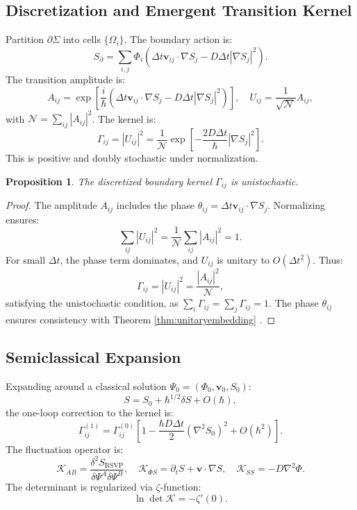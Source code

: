 \documentclass[12pt]{article}
\newtheorem{proposition}{Proposition}
\begin{document}
\subsection{Discretization and Emergent Transition Kernel}

Partition \(\partial \Sigma\) into cells \(\{\Omega_i\}\). The boundary action is:
\[
S_{\partial} = \sum_{i,j} \Phi_i \left( \Delta t \mathbf{v}_{ij} \cdot \nabla S_j - D \Delta t |\nabla S_j|^2 \right).
\]
The transition amplitude is:
\[
A_{ij} = \exp\left[ \frac{i}{\hbar} \left( \Delta t \mathbf{v}_{ij} \cdot \nabla S_j - D \Delta t |\nabla S_j|^2 \right) \right], \quad U_{ij} = \frac{1}{\sqrt{\mathcal{N}}} A_{ij},
\]
with \(\mathcal{N} = \sum_{ij} |A_{ij}|^2\). The kernel is:
\[
\Gamma_{ij} = |U_{ij}|^2 = \frac{1}{\mathcal{N}} \exp\left[ -\frac{2 D \Delta t}{\hbar} |\nabla S_j|^2 \right].
\]
This is positive and doubly stochastic under normalization.

\begin{proposition}
\label{prop:kernel}
The discretized boundary kernel \(\Gamma_{ij}\) is unistochastic.
\end{proposition}

\begin{proof}
The amplitude \(A_{ij}\) includes the phase \(\theta_{ij} = \Delta t \mathbf{v}_{ij} \cdot \nabla S_j\). Normalizing ensures:
\[
\sum_{ij} |U_{ij}|^2 = \frac{1}{\mathcal{N}} \sum_{ij} |A_{ij}|^2 = 1.
\]
For small \(\Delta t\), the phase term dominates, and \(U_{ij}\) is unitary to \(O(\Delta t^2)\). Thus:
\[
\Gamma_{ij} = |U_{ij}|^2 = \frac{|A_{ij}|^2}{\mathcal{N}},
\]
satisfying the unistochastic condition, as \(\sum_i \Gamma_{ij} = \sum_j \Gamma_{ij} = 1\). The phase \(\theta_{ij}\) ensures consistency with Theorem \ref{thm:unitaryembedding} \cite{Zyczkowski1994}.
\end{proof}

\subsection{Semiclassical Expansion}

Expanding around a classical solution \(\Psi_0 = (\Phi_0, \mathbf{v}_0, S_0)\):
\[
S = S_0 + \hbar^{1/2} \delta S + O(\hbar),
\]
the one-loop correction to the kernel is:
\[
\Gamma_{ij}^{(1)} = \Gamma_{ij}^{(0)} \left[ 1 - \frac{\hbar D \Delta t}{2} (\nabla^2 S_0)^2 + O(\hbar^2) \right].
\]
The fluctuation operator is:
\[
\mathcal{K}_{AB} = \frac{\delta^2 S_{\mathrm{RSVP}}}{\delta \Psi^A \delta \Psi^B}, \quad \mathcal{K}_{\Phi S} = \partial_t S + \mathbf{v} \cdot \nabla S, \quad \mathcal{K}_{S S} = -D \nabla^2 \Phi.
\]
The determinant is regularized via \(\zeta\)-function:
\[
\ln \det \mathcal{K} = -\zeta'(0).
\]
\end{document}

